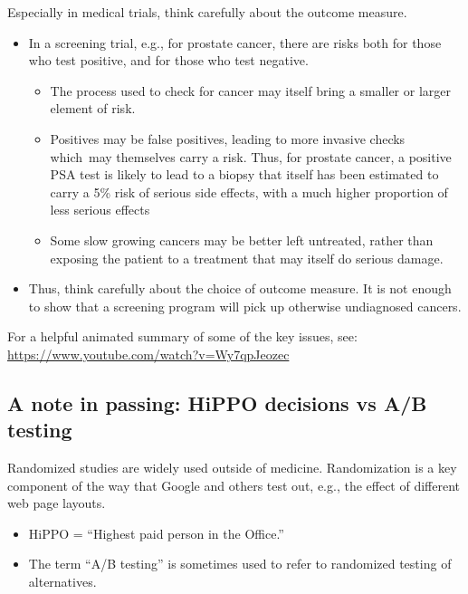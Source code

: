 \documentclass[
  10pt,
  b5paper]{book}
\providecommand{\tightlist}{%
  \setlength{\itemsep}{0pt}\setlength{\parskip}{0pt}}
\begin{document}
Especially in medical trials, think carefully about the outcome measure.

\begin{itemize}
\tightlist
\item
  In a screening trial, e.g., for prostate cancer, there are
  risks both for those who test positive, and for
  those who test negative.

  \begin{itemize}
  \tightlist
  \item
    The process used to check for cancer may itself bring
    a smaller or larger element of risk.
  \item
    Positives may be false positives, leading to more invasive
    checks which~may themselves carry a risk. Thus, for prostate
    cancer, a positive PSA test is likely to lead to a biopsy that
    itself has been estimated to carry a 5\% risk of serious side
    effects, with a much higher proportion of less serious effects
    \citep[p.245]{levitin_2015}
  \item
    Some slow growing cancers may be better left untreated,
    rather than exposing the patient to a treatment that may itself
    do serious damage.
  \end{itemize}
\item
  Thus, think carefully about the choice of outcome measure. It is not
  enough to show that a screening program will pick up otherwise
  undiagnosed cancers.
\end{itemize}

For a helpful animated summary of some of the key issues, see:\\
\url{https://www.youtube.com/watch?v=Wy7qpJeozec}

\hypertarget{a-note-in-passing-hippo-decisions-vs-ab-testing}{%
\subsection*{A note in passing: HiPPO decisions vs A/B testing}\label{a-note-in-passing-hippo-decisions-vs-ab-testing}}

Randomized studies are widely used outside of medicine.
Randomization is a key component of the way that Google and
others test out, e.g., the effect of different web page layouts.

\begin{itemize}
\tightlist
\item
  HiPPO = ``Highest paid person in the Office.''
\item
  The term ``A/B testing'' is sometimes used to refer to randomized
  testing of alternatives.
\end{itemize}
\end{document}
